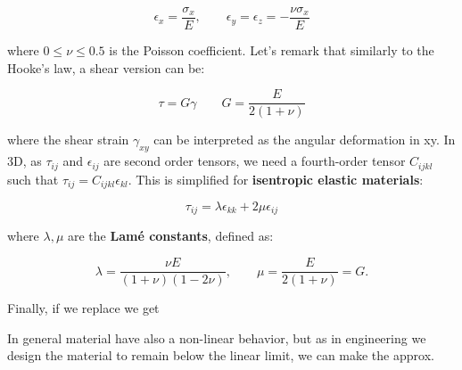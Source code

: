			\begin{equation}
			\epsilon _x = \frac{\sigma _x}{E} , \qquad \epsilon _y = \epsilon _z = - \frac{\nu \sigma _x}{E}
			\end{equation}
			
			where $0\leq\nu\leq 0.5$ is the Poisson coefficient. Let's remark that similarly to the Hooke's law, a shear version can be:
			
			\begin{equation}
			\tau = G \gamma \qquad G =\frac{E}{2 (1+\nu )}
			\end{equation}
			
			where the shear strain $\gamma _{xy}$ can be interpreted as the angular deformation in xy. In 3D, as $\tau _{ij}$ and $\epsilon _{ij}$ are second order tensors, we need a fourth-order tensor $C_{ijkl}$ such that $\tau _{ij} = C_{ijkl} \epsilon _{kl}$. This is simplified for \textbf{isentropic elastic materials}:
			
			\begin{equation}
			\tau _{ij} = \lambda \epsilon _{kk} + 2\mu \epsilon _{ij}
			\end{equation}
			
			where $\lambda, \mu$ are the \textbf{Lamé constants}, defined as:
			
			\begin{equation}
			\lambda = \frac{\nu E}{(1+\nu) (1-2\nu) }, \qquad \mu = \frac{E}{2(1+\nu)} = G.
			\end{equation}
			
			Finally, if we replace we get 
			
			\begin{center}
			\end{center}
			
			In general material have also a non-linear behavior, but as in engineering we design the material to remain below the linear limit, we can make the approx. 
			
